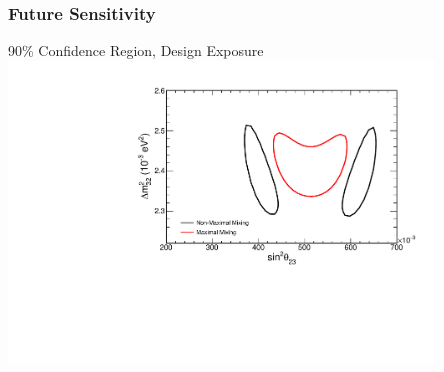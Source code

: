 \documentclass[10pt,professionalfonts,xcolor=table]{beamer}
\begin{document}
\begin{frame}
\frametitle{Future Sensitivity}
\centering
\textcolor{custom_red}{90\% Confidence Region, \nova Design Exposure}
\vspace{-15pt}
\includegraphics[angle=-90, width=0.85\textwidth]{figures/results/contours6yr.pdf}

\end{frame}
\end{document}
